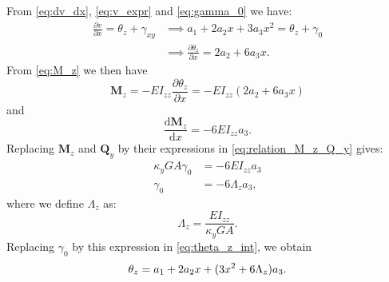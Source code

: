 \documentclass[a4paper,11pt]{article}
\newcommand{\bM}{\mathbf{M}}
\newcommand{\bQ}{\mathbf{Q}}
\newcommand{\dif}{\mathrm{d}}
\begin{document}
\noindent From \eqref{eq:dv_dx}, \eqref{eq:v_expr} and \eqref{eq:gamma_0} we have:
\begin{align}
	\frac{\partial v}{\partial x} = \theta_z + \gamma_{xy} & \implies a_1 + 2a_2x + 3a_3x^2 = \theta_z + \gamma_0 \label{eq:theta_z_int} \\
	& \implies \frac{\partial \theta_z}{\partial x} = 2a_2 + 6a_3x. \label{eq:theta_z_int_2}
\end{align}
From \eqref{eq:M_z} we then have
\begin{equation}
	\bM_z = -EI_{zz}\frac{\partial \theta_z}{\partial x} = -EI_{zz}(2a_2 + 6a_3x)
\end{equation}
and
\begin{equation}
	\frac{\dif \bM_z}{\dif x} = -6EI_{zz}a_3.
\end{equation}
Replacing $\bM_z$ and $\bQ_y$ by their expressions in \eqref{eq:relation_M_z_Q_y}
gives:
\begin{align}
\kappa_y G A \gamma_0 & = -6EI_{zz}a_3 \\
\gamma_0 & = -6\Lambda_z a_3,
\end{align}
where we define $\Lambda_z$ as:
\begin{equation}
	\Lambda_z = \frac{EI_{zz}}{\kappa_y G A}.
\end{equation}
Replacing $\gamma_0$ by this expression in \eqref{eq:theta_z_int}, we obtain
\begin{equation} \label{eq:theta_z}
	\theta_z = a_1 + 2a_2x + (3x^2 + 6\Lambda_z)a_3.\\
\end{equation}
\end{document}
